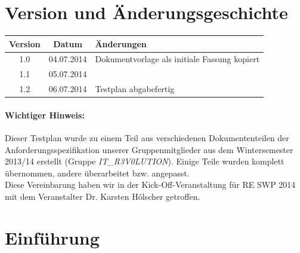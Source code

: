 \documentclass[fontsize=12pt,paper=a4,twoside]{scrartcl}
\begin{document}


\newpage

  \thispagestyle{fancy}
  \fancyhead{}
  \fancyfoot{}
  \renewcommand{\headrulewidth}{0.4pt}
  \tableofcontents

\newpage



\section*{Version und Änderungsgeschichte}

\begin{tabular}{ccl}
Version & Datum & Änderungen \\
\hline
1.0 & 04.07.2014 & Dokumentvorlage als initiale Fassung kopiert \\
1.1 & 05.07.2014 & \\
1.2 & 06.07.2014 & Testplan abgabefertig
\end{tabular}

\paragraph{Wichtiger Hinweis:} Dieser Testplan wurde zu einem Teil aus verschiedenen Dokumententeilen der Anforderungsspezifikation unserer Gruppenmitglieder aus dem Wintersemester 2013/14 erstellt (Gruppe \textit{IT\_R3V0LUTION}). Einige Teile wurden komplett übernommen, andere überarbeitet bzw. angepasst. \\
Diese Vereinbarung haben wir in der Kick-Off-Veranstaltung für RE SWP 2014 mit dem Veranstalter Dr. Karsten Hölscher getroffen. \\

\section{Einführung}\label{c01}
\end{document}
